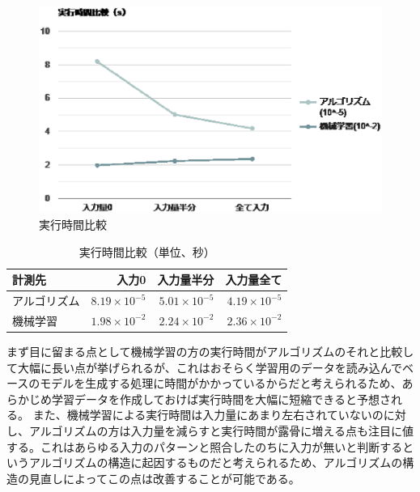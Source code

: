 \documentclass{article}
\begin{document}
\begin{figure}
\centering
\includegraphics[width=0.5\linewidth]{a6amq-jll55.eps}
\caption{\label{fig:frog}実行時間比較}
\end{figure}

 

\begin{table}
\centering
\begin{tabular}{l|r|r|r}
計測先 & 入力0 & 入力量半分 & 入力量全て \\\hline
アルゴリズム & $8.19\times10^{-5}$ & $5.01\times10^{-5}$ & $4.19\times10^{-5}$\\
機械学習 & $1.98\times10^{-2}$ & $2.24\times10^{-2}$ & $2.36\times10^{-2}$
\end{tabular}
\caption{\label{tab:widgets}実行時間比較（単位、秒）}
\end{table}

まず目に留まる点として機械学習の方の実行時間がアルゴリズムのそれと比較して大幅に長い点が挙げられるが、これはおそらく学習用のデータを読み込んでベースのモデルを生成する処理に時間がかかっているからだと考えられるため、あらかじめ学習データを作成しておけば実行時間を大幅に短縮できると予想される。
また、機械学習による実行時間は入力量にあまり左右されていないのに対し、アルゴリズムの方は入力量を減らすと実行時間が露骨に増える点も注目に値する。これはあらゆる入力のパターンと照合したのちに入力が無いと判断するというアルゴリズムの構造に起因するものだと考えられるため、アルゴリズムの構造の見直しによってこの点は改善することが可能である。
\end{document}
